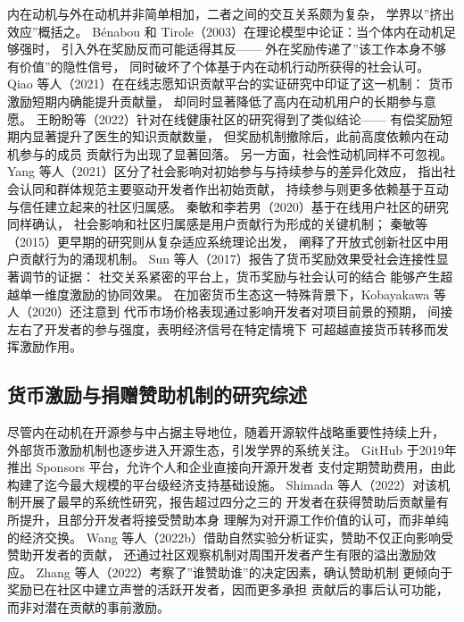 内在动机与外在动机并非简单相加，二者之间的交互关系颇为复杂，
学界以”挤出效应”概括之。
Bénabou 和 Tirole（2003）在理论模型中论证：当个体内在动机足够强时，
引入外在奖励反而可能适得其反——
外在奖励传递了”该工作本身不够有价值”的隐性信号，
同时破坏了个体基于内在动机行动所获得的社会认可\cite{benabou2003intrinsic}。
Qiao 等人（2021）在在线志愿知识贡献平台的实证研究中印证了这一机制：
货币激励短期内确能提升贡献量，
却同时显著降低了高内在动机用户的长期参与意愿\cite{qiao2021mitigating}。
王盼盼等（2022）针对在线健康社区的研究得到了类似结论——
有偿奖励短期内显著提升了医生的知识贡献数量，
但奖励机制撤除后，此前高度依赖内在动机参与的成员
贡献行为出现了显著回落\cite{wang2022reward}。
另一方面，社会性动机同样不可忽视。
Yang 等人（2021）区分了社会影响对初始参与与持续参与的差异化效应，
指出社会认同和群体规范主要驱动开发者作出初始贡献，
持续参与则更多依赖基于互动与信任建立起来的社区归属感\cite{yang2021differential}。
秦敏和李若男（2020）基于在线用户社区的研究同样确认，
社会影响和社区归属感是用户贡献行为形成的关键机制\cite{qin2020contribution}；
秦敏等（2015）更早期的研究则从复杂适应系统理论出发，
阐释了开放式创新社区中用户贡献行为的涌现机制\cite{qin2015cas}。
Sun 等人（2017）报告了货币奖励效果受社会连接性显著调节的证据：
社交关系紧密的平台上，货币奖励与社会认可的结合
能够产生超越单一维度激励的协同效果\cite{sun2017motivation}。
在加密货币生态这一特殊背景下，Kobayakawa 等人（2020）还注意到
代币市场价格表现通过影响开发者对项目前景的预期，
间接左右了开发者的参与强度，表明经济信号在特定情境下
可超越直接货币转移而发挥激励作用\cite{kobayakawa2020impact}。

\subsection{货币激励与捐赠赞助机制的研究综述}

尽管内在动机在开源参与中占据主导地位，随着开源软件战略重要性持续上升，
外部货币激励机制也逐步进入开源生态，引发学界的系统关注。
GitHub 于2019年推出 Sponsors 平台，允许个人和企业直接向开源开发者
支付定期赞助费用，由此构建了迄今最大规模的平台级经济支持基础设施。
Shimada 等人（2022）对该机制开展了最早的系统性研究，报告超过四分之三的
开发者在获得赞助后贡献量有所提升，且部分开发者将接受赞助本身
理解为对开源工作价值的认可，而非单纯的经济交换\cite{shimada2022github}。
Wang 等人（2022b）借助自然实验分析证实，赞助不仅正向影响受赞助开发者的贡献，
还通过社区观察机制对周围开发者产生有限的溢出激励效应\cite{wang2022influence}。
Zhang 等人（2022）考察了”谁赞助谁”的决定因素，确认赞助机制
更倾向于奖励已在社区中建立声誉的活跃开发者，因而更多承担
贡献后的事后认可功能，而非对潜在贡献的事前激励\cite{zhang2022who}。

